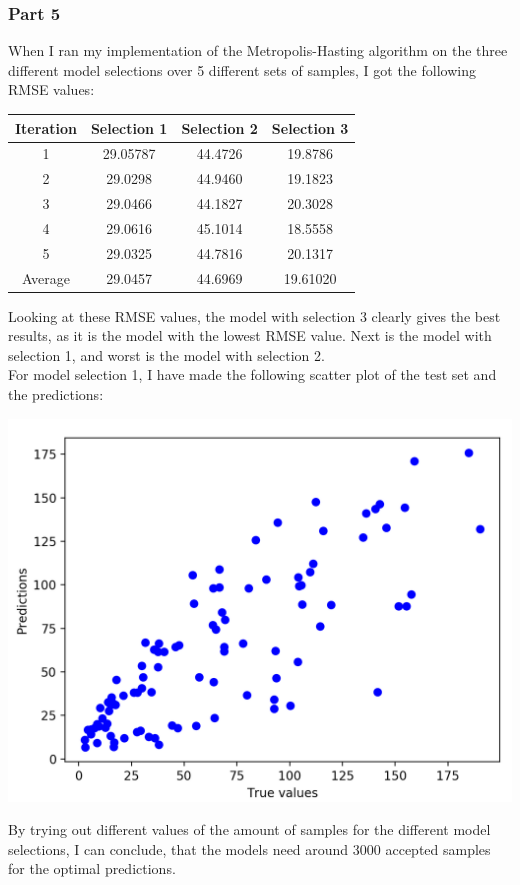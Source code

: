 \documentclass{report}
\begin{document}
\subsubsection*{Part 5}
When I ran my implementation of the Metropolis-Hasting algorithm on the three different model selections over 5 different sets of samples, I got the following RMSE values:
\begin{center}
    \begin{tabular}{|c|c|c|c|}
        \hline
        Iteration & Selection 1 & Selection 2 & Selection 3 \\
        \hline
        1 & 29.05787 & 44.4726 & 19.8786 \\
        \hline
        2 & 29.0298 & 44.9460 & 19.1823 \\
        \hline
        3 & 29.0466 & 44.1827 & 20.3028 \\
        \hline
        4 & 29.0616 & 45.1014 & 18.5558 \\
        \hline
        5 & 29.0325 & 44.7816 & 20.1317 \\
        \hline
        Average & 29.0457 & 44.6969 & 19.61020 \\
        \hline
    \end{tabular}
\end{center}
Looking at these RMSE values, the model with selection 3 clearly gives the best results, as it is the model with the lowest RMSE value. Next is the model with selection 1, and worst is the model with selection 2. \\

For model selection 1, I have made the following scatter plot of the test set and the predictions:
\begin{center}
    \includegraphics[height = 7 cm]{5_5.png}
\end{center}

By trying out different values of the amount of samples for the different model selections, I can conclude, that the models need around 3000 accepted samples for the optimal predictions. \\
\end{document}
